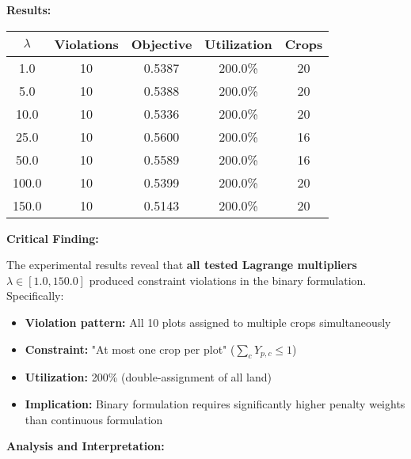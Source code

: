 \documentclass{article}
\begin{document}
\textbf{Results:}

\begin{center}
\begin{tabular}{ccccc}
\hline
$\lambda$ & Violations & Objective & Utilization & Crops \\
\hline
1.0 & 10 & 0.5387 & 200.0\% & 20 \\
5.0 & 10 & 0.5388 & 200.0\% & 20 \\
10.0 & 10 & 0.5336 & 200.0\% & 20 \\
25.0 & 10 & 0.5600 & 200.0\% & 16 \\
50.0 & 10 & 0.5589 & 200.0\% & 16 \\
100.0 & 10 & 0.5399 & 200.0\% & 20 \\
150.0 & 10 & 0.5143 & 200.0\% & 20 \\
\hline
\end{tabular}
\end{center}

\textbf{Critical Finding:}

The experimental results reveal that \textbf{all tested Lagrange multipliers} $\lambda \in [1.0, 150.0]$ produced constraint violations in the binary formulation. Specifically:

\begin{itemize}
    \item \textbf{Violation pattern:} All 10 plots assigned to multiple crops simultaneously
    \item \textbf{Constraint:} "At most one crop per plot" ($\sum_c Y_{p,c} \leq 1$)
    \item \textbf{Utilization:} 200\% (double-assignment of all land)
    \item \textbf{Implication:} Binary formulation requires significantly higher penalty weights than continuous formulation
\end{itemize}

\textbf{Analysis and Interpretation:}
\end{document}
